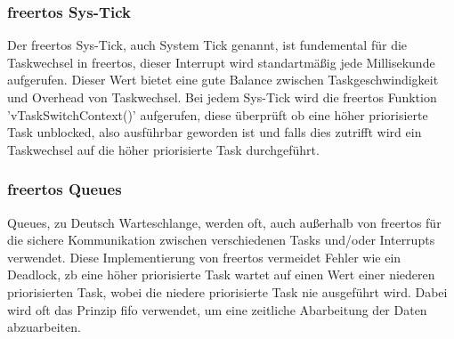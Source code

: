 \documentclass[../EDF Master Thesis.tex]{subfiles}
\begin{document}
\subsubsection{\ac{freertos} Sys-Tick}
Der \ac{freertos} Sys-Tick, auch System Tick genannt, ist fundemental für die Taskwechsel in \ac{freertos}, dieser Interrupt wird standartmäßig jede Millisekunde aufgerufen.
Dieser Wert bietet eine gute Balance zwischen Taskgeschwindigkeit und Overhead von Taskwechsel.
Bei jedem Sys-Tick wird die \ac{freertos} Funktion 'vTaskSwitchContext()' aufgerufen, diese überprüft ob eine höher priorisierte Task unblocked, also ausführbar geworden ist und falls dies zutrifft wird ein Taskwechsel auf die höher priorisierte Task durchgeführt.

\subsubsection{\ac{freertos} Queues}
Queues, zu Deutsch Warteschlange, werden oft, auch außerhalb von \ac{freertos} für die sichere Kommunikation zwischen verschiedenen Tasks und/oder Interrupts verwendet.
Diese Implementierung von \ac{freertos} vermeidet Fehler wie ein Deadlock, \ac{zb} eine höher priorisierte Task wartet auf einen Wert einer niederen priorisierten Task, wobei die niedere priorisierte Task nie ausgeführt wird.
Dabei wird oft das Prinzip \ac{fifo} verwendet, um eine zeitliche Abarbeitung der Daten abzuarbeiten.
\end{document}
